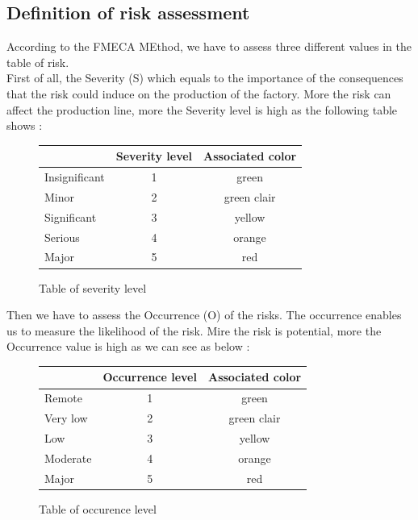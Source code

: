 \subsection{Definition of risk assessment}

According to the FMECA MEthod, we have to assess three different values in the table of risk.\\

First of all, the Severity (S) which equals to the importance of the consequences that the risk could induce on the production of the factory. More the risk can affect the production line, more the Severity level is high as the following table shows :

\begin{figure}[h]
    \centering
    \begin{tabular}{| p{4cm} | c | c |}
        \hline
        \rowcolor{heading-color}\multicolumn{1}{|c|}{Severity definition} & Severity level & Associated color\\
        \hline
        Insignificant & 1 & green  \\
        \hline
        Minor & 2 & green clair  \\
        \hline
        Significant & 3 & yellow  \\
        \hline
        Serious & 4 & orange  \\
        \hline
        Major & 5 & red  \\
        \hline
    \end{tabular}
    \caption{Table of severity level}
\end{figure}

Then we have to assess the Occurrence (O) of the risks. The occurrence enables us to measure the likelihood of the risk. Mire the risk is potential, more the Occurrence value is high as we can see as below :

    \begin{figure}[h]
        \centering
        \begin{tabular}{| p{4cm} | c | c |}
            \hline
            \rowcolor{heading-color}\multicolumn{1}{|c|}{Occurrence definition} & Occurrence level & Associated color\\
            \hline
            Remote & 1 & green  \\
            \hline
            Very low & 2 & green clair  \\
            \hline
            Low & 3 & yellow  \\
            \hline
            Moderate & 4 & orange  \\
            \hline
            Major & 5 & red  \\
            \hline
        \end{tabular}
        \caption{Table of occurence level}
\end{figure}


